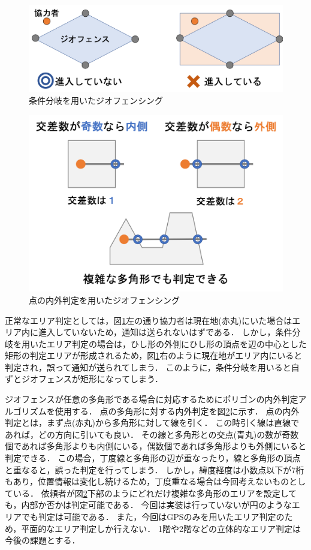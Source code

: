 \begin{figure}[tbh]
    \centering
    \includegraphics[width=16cm]{img_polygon_1.png}
    \caption{条件分岐を用いたジオフェンシング}
    \label{fig:polygon_1}
\end{figure}

\begin{figure}[tbh]
    \centering
    \includegraphics[width=16cm]{img_polygon_2.png}
    \caption{点の内外判定を用いたジオフェンシング}
    \label{fig:polygon_2}
\end{figure}

正常なエリア判定としては，図\ref{fig:polygon_1}左の通り協力者は現在地(赤丸)にいた場合はエリア内に進入していないため，通知は送られないはずである．
しかし，条件分岐を用いたエリア判定の場合は，ひし形の外側にひし形の頂点を辺の中心とした矩形の判定エリアが形成されるため，図\ref{fig:polygon_1}右のように現在地がエリア内にいると判定され，誤って通知が送られてしまう．
このように，条件分岐を用いると自ずとジオフェンスが矩形になってしまう．

ジオフェンスが任意の多角形である場合に対応するためにポリゴンの内外判定アルゴリズム\cite{naigai}を使用する．
点の多角形に対する内外判定を図\ref{fig:polygon_2}に示す．
点の内外判定とは，まず点(赤丸)から多角形に対して線を引く．
この時引く線は直線であれば，どの方向に引いても良い．
その線と多角形との交点(青丸)の数が奇数個であれば多角形よりも内側にいる，偶数個であれば多角形よりも外側にいると判定できる．
この場合，丁度線と多角形の辺が重なったり，線と多角形の頂点と重なると，誤った判定を行ってしまう．
しかし，緯度経度は小数点以下が7桁もあり，位置情報は変化し続けるため，丁度重なる場合は今回考えないものとしている．
依頼者が図\ref{fig:polygon_2}下部のようにどれだけ複雑な多角形のエリアを設定しても，内部か否かは判定可能である．
今回は実装は行っていないが円のようなエリアでも判定は可能である．
また，今回はGPSのみを用いたエリア判定のため，平面的なエリア判定しか行えない．
1階や2階などの立体的なエリア判定は今後の課題とする．

